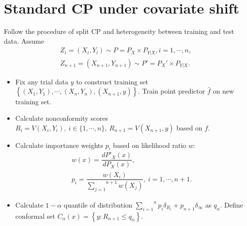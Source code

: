 \documentclass[12pt, a4paper, oneside]{article}
\begin{document}
\section{Standard CP under covariate shift}
    Follow the procedure of split CP and heterogeneity between training and test data\cite{tibshirani2019conformal}. Assume
    \begin{gather*}
        Z_i=(X_i,Y_i)\sim P=P_X\times P_{Y|X},i=1,\cdots,n,\\
        Z_{n+1}=(X_{n+1},Y_{n+1})\sim P'=P_X'\times P_{Y|X}.
    \end{gather*}
    \begin{itemize}
        \item Fix any trial data $y$ to construct training set $\left\{ (X_1,Y_1),\cdots,(X_n,Y_n),(X_{n+1},y) \right\}$. Train point predictor $\hat{f}$ on new training set.
        \item Calculate nonconformity scores $R_i=V(X_i,Y_i),\ i\in\{1,\cdots,n\},\ R_{n+1}=V(X_{n+1},y)$ based on $\hat{f}$.
        \item Calculate importance weights $p_i$ based on likelihood ratio $w$:
        \begin{gather*}
            w(x)=\dfrac{dP'_X(x)}{dP_X(x)},\\
            p_i=\dfrac{w(X_i)}{\overset{n+1}{\underset{j=1}\sum}w(X_j)},\ i=1,\cdots,n+1.
        \end{gather*}
        \item Calculate $1-\alpha$ quantile of distribution $\overset{n}{\underset{i=1}\sum}p_i\delta_{R_i}+p_{n+1}\delta_{\infty}$ as $q_\alpha$. Define conformal set $C_\alpha(x)=\left\{ y:R_{n+1}\leq q_\alpha \right\}$.
    \end{itemize}
\end{document}
